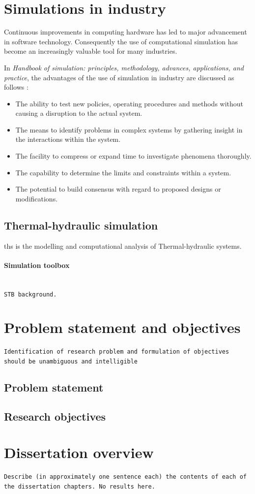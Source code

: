 	
\section{Simulations in industry}

Continuous improvements in computing hardware has led to major advancement in software technology. Consequently the use of computational simulation has become an increasingly valuable tool for many industries.\cite{kocsis2003integration} \par 

 In \textit{ Handbook of simulation: principles, methodology, advances, applications, and practice}, the advantages of the use of simulation in industry are discussed as follows \cite{banks1998handbook}: 
\begin{itemize}
	\item The ability to test new policies, operating procedures and methods without causing a disruption to the actual system.
	\item The means to identify problems in complex systems by gathering insight in the interactions within the system.
	\item The facility to compress or expand time to investigate phenomena thoroughly.
	\item The capability to determine the limits and constraints within a system.
	\item The potential to build consensus with regard to proposed designs or modifications.
\end{itemize}

\subsection{Thermal-hydraulic simulation}
\gls{ths} is the modelling and computational analysis of Thermal-hydraulic systems.
\paragraph{Simulation toolbox}\leavevmode\\
\texttt{STB background.}
\section{Problem statement and objectives}
\texttt{Identification of research problem and formulation of objectives should be unambiguous and intelligible}
\subsection{Problem statement}
\subsection{Research objectives}

\section{Dissertation overview}
\texttt{Describe (in approximately one sentence each) the contents of each of the dissertation chapters. No results here.}